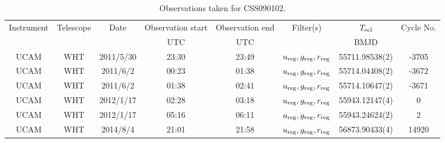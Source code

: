 \begin{table}
	\begin{center}
		\begin{tabular}{cccccccc}
			\hline
			Instrument & Telescope & Date & Observation start & Observation end & Filter(s) & $T_{\rm ecl}$ & Cycle No. \\
				&  &  & UTC & UTC &  & BMJD &  \\
			\hline
			\hline
			UCAM & WHT & 2011/5/30 & 23:30 & 23:49 & $u_{\rm reg},g_{\rm reg},r_{\rm reg}$ & 55711.98538(2)                                                                                                            &                                       -3705 \\
			UCAM & WHT & 2011/6/2  & 00:23 & 01:38 & $u_{\rm reg},g_{\rm reg},r_{\rm reg}$ & 55714.04408(2)                                                                                                            &                                       -3672 \\
			UCAM & WHT & 2011/6/2  & 01:38 & 02:41 & $u_{\rm reg},g_{\rm reg},r_{\rm reg}$ & 55714.10647(2)                                                                                                            &                                       -3671 \\
			UCAM & WHT & 2012/1/17 & 02:28 & 03:18 & $u_{\rm reg},g_{\rm reg},r_{\rm reg}$ & 55943.12147(4)                                                                                                            &                                           0 \\
			UCAM & WHT & 2012/1/17 & 05:16 & 06:11 & $u_{\rm reg},g_{\rm reg},r_{\rm reg}$ & 55943.24624(2)                                                                                                            &                                           2 \\
			UCAM & WHT & 2014/8/4  & 21:01 & 21:58 & $u_{\rm reg},g_{\rm reg},r_{\rm reg}$ & 56873.90433(4)                                                                                                            &                                       14920 \\
		   \hline
		\end{tabular}
	\end{center}
	\caption{Observations taken for CSS090102.}
	\label{table:observing:observation logs CSS090102}
\end{table}
